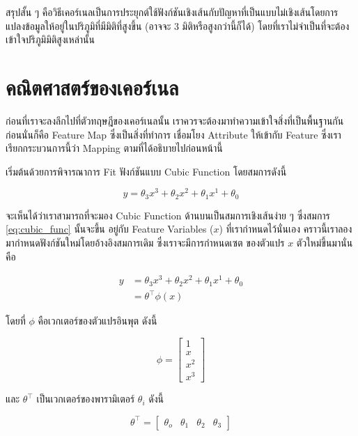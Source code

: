 สรุปสั้น ๆ คือวิธีเคอร์เนลเป็นการประยุกต์ใช้ฟังก์ชันเชิงเส้นกับปัญหาที่เป็นแบบไม่เชิงเส้นโดยการแปลงข้อมูลให้อยู่ในปริภูมิที่มีมิติที่สูงขึ้น (อาจจะ 3 
มิติหรือสูงกว่านี้ก็ได้) โดยที่เราไม่จำเป็นที่จะต้องเข้าใจปริภูมิมิติสูงเหล่านั้น

\section{คณิตศาสตร์ของเคอร์เนล}
\label{sec:math_kernel}

ก่อนที่เราจะลงลึกไปที่ตัวทฤษฎีของเคอร์เนลนั้น เราควรจะต้องมาทำความเข้าใจสิ่งที่เป็นพื้นฐานกันก่อนนั่นก็คือ Feature Map ซึ่งเป็นสิ่งที่ทำการ%
เชื่อมโยง Attribute ให้เข้ากับ Feature ซึ่งเราเรียกกระบวนการนี้ว่า Mapping ตามที่ได้อธิบายไปก่อนหน้านี้

เริ่มต้นด้วยการพิจารณาการ Fit ฟังก์ชันแบบ Cubic Function โดยสมการดังนี้

\begin{equation}\label{eq:cubic_func}
    y = \theta_{3}x^{3} + \theta_{2}x^{2} + \theta_{1}x^{1} + \theta_{0}
\end{equation}

\noindent จะเห็นได้ว่าเราสามารถที่จะมอง Cubic Function ด้านบนเป็นสมการเชิงเส้นง่าย ๆ ซึ่งสมการ \ref{eq:cubic_func} นั้นจะขึ้น%
อยู่กับ Feature Variables ($x$) ที่เรากำหนดไว้นั่นเอง คราวนี้เราลองมากำหนดฟังก์ชันใหม่โดยอ้างอิงสมการเดิม ซึ่งเราจะมีการกำหนดเซต%
ของตัวแปร $x$ ตัวใหม่ขึ้นมานั่นคือ

\begin{align}\label{eq:cubic_func_2}
    y &= \theta_{3}x^{3} + \theta_{2}x^{2} + \theta_{1}x^{1} + \theta_{0} \nonumber \\ 
      &= \theta^{\top}\phi(x)
\end{align}

\noindent โดยที่ $\phi$ คือเวกเตอร์ของตัวแปรอินพุต ดังนี้

\begin{equation}
\phi = 
\begin{bmatrix}
    1 \\
    x \\
    x^{2} \\
    x^{3} 
\end{bmatrix}
\end{equation}

\noindent และ $\theta^{\top}$ เป็นเวกเตอร์ของพารามิเตอร์ $\theta_{i}$ ดังนี้

\begin{equation}
\theta^{\top} =
\begin{bmatrix}
    \theta_{o} & \theta_{1} & \theta_{2} & \theta_{3}
\end{bmatrix}
\end{equation}

